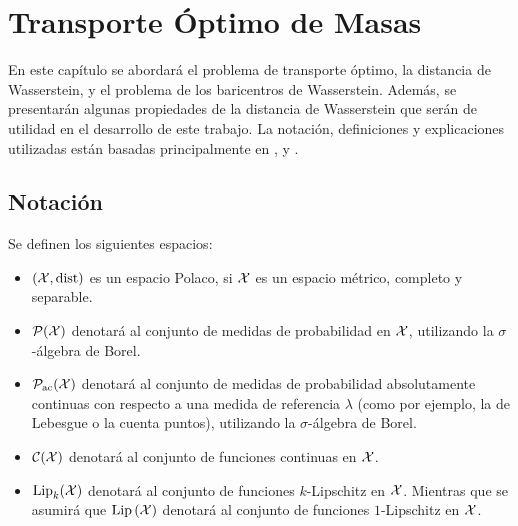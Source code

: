 \chapter{Transporte Óptimo de Masas}
\label{chap:transporte-optimo-de-masas}

En este capítulo se abordará el problema de transporte óptimo, la distancia de Wasserstein, y el problema de los baricentros de Wasserstein. Además, se presentarán algunas propiedades de la distancia de Wasserstein que serán de utilidad en el desarrollo de este trabajo. La notación, definiciones y explicaciones utilizadas están basadas principalmente en \cite{villani2009optimal}, \cite{peyre2019computational} y \cite{panaretos2020invitation}.

\section{Notación}
 {
  \begin{definition}
	  Se definen los siguientes espacios:
	  \begin{itemize}
		  \item $(\cX, \dist)$ es un espacio Polaco, si $\cX$ es un espacio métrico, completo y separable.
		  \item $\ProbSpace[\cX]$ denotará al conjunto de medidas de probabilidad en $\cX$, utilizando la $\sigma$-álgebra de Borel.
		  \item $\ProbSpaceAC[\cX]$ denotará al conjunto de medidas de probabilidad absolutamente continuas con respecto a una medida de referencia $\lambda$ (como por ejemplo, la de Lebesgue o la cuenta puntos), utilizando la $\sigma$-álgebra de Borel.
		  \item $\mathcal{C}(\cX)$ denotará al conjunto de funciones continuas en $\cX$.
		  \item ${\Lip}_{k}(\cX)$ denotará al conjunto de funciones $k$-Lipschitz en $\cX$. Mientras que se asumirá que $\Lip[\cX]$ denotará al conjunto de funciones $1$-Lipschitz en $\cX$. 
	  \end{itemize}
  \end{definition}



 }

